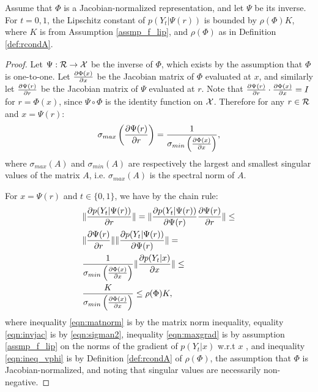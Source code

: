 \begin{thmapplem}\label{lem:lip}
Assume that $\Phi$ is a Jacobian-normalized representation, and let $\Psi$ be its inverse.
For $t=0,1$, the Lipschitz constant of $p(Y_t|\Psi(r))$ is bounded by $\rho(\Phi) K$, where  $K$ is from Assumption \ref{assmp_f_lip}, and $\rho(\Phi)$ as in Definition \ref{def:rcondA}.
\end{thmapplem}
\begin{proof}
Let $\Psi: \mathcal{R} \rightarrow \mathcal X$ be the inverse of $\Phi$, which exists by the assumption that $\Phi$ is one-to-one. Let $\frac{\partial \Phi(x)}{\partial x}$ be the Jacobian matrix of $\Phi$ evaluated at $x$, and similarly let $\frac{\partial \Psi(r)}{\partial r}$ be the Jacobian matrix of $\Psi$ evaluated at $r$. Note that $\frac{\partial \Psi(r)}{\partial r} \cdot \frac{\partial \Phi(x)}{\partial x} = I$ for $r= \Phi(x)$, since $\Psi \circ \Phi$ is the identity function on $\mathcal X$.	Therefore for any $r \in \mathcal{R}$ and $x= \Psi(r)$:
\begin{equation}\label{eqn:sigman2}
\sigma_{max}\left(\frac{\partial \Psi(r)}{\partial r}\right) = \frac{1}{\sigma_{min}\left(\frac{\partial \Phi(x)}{\partial x}\right)},
\end{equation}
where $\sigma_{max}(A)$ and $\sigma_{min}(A)$ are respectively the largest and smallest singular values of the matrix $A$, i.e. $\sigma_{max}(A)$ is the spectral norm of $A$.


For $x = \Psi(r)$ and $t \in \{0,1\}$, we have by the chain rule:
\begin{align}
& \| \frac{\partial p(Y_t|\Psi(r))}{\partial r} \| =  \| \frac{\partial p(Y_t|\Psi(r))}{\partial \Psi(r)}  \frac{\partial \Psi(r)}{\partial r}\|  \leq \label{eqn:matnorm}\\
& \| \frac{\partial \Psi(r)}{\partial r}\|  \| \frac{\partial p(Y_t|\Psi(r))}{\partial \Psi(r)} \|  = \label{eqn:invjac} \\
& \frac{1}{\sigma_{min}\left(\frac{\partial \Phi(x)}{\partial x}\right)} \| \frac{\partial p(Y_t|x)}{\partial x} \| \leq \label{eqn:maxgrad}\\
&  \frac{K}{\sigma_{min}\left(\frac{\partial \Phi(x)}{\partial x}\right)} \leq  \rho(\Phi) K \label{eqn:ineq_vphi},
\end{align}
where inequality \eqref{eqn:matnorm} is by the matrix norm inequality, equality \eqref{eqn:invjac} is by \eqref{eqn:sigman2}, inequality \eqref{eqn:maxgrad} is by assumption \ref{assmp_f_lip} on the norms of the gradient of $p(Y_t|x)$ w.r.t $x$ , and inequality \eqref{eqn:ineq_vphi} is by Definition \ref{def:rcondA} of $\rho(\Phi)$, the assumption that $\Phi$ is Jacobian-normalized, and noting that singular values are necessarily non-negative.


\end{proof}

